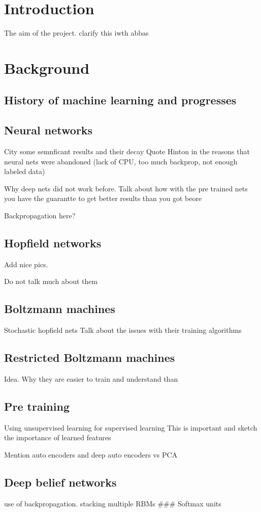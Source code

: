 \documentclass[]{article}
\author{}
\date{}
\begin{document}
\section{Introduction}

The aim of the project. clarify this iwth abbas

\section{Background}

\subsection{History of machine learning and progresses}

\subsection{Neural networks}

City some semnficant results and their decay Quote Hinton in the reasons
that neural nets were abandoned (lack of CPU, too much backprop, not
enough labeled data)

Why deep nets did not work before. Talk about how with the pre trained
nets you have the guarantte to get better results than you got beore

Backpropagation here?

\subsection{Hopfield networks}

Add nice pics.

Do not talk much about them

\subsection{Boltzmann machines}

Stochastic hopfield nets Talk about the issues with their training
algorithms

\subsection{Restricted Boltzmann machines}

Idea. Why they are easier to train and understand than

\subsection{Pre training}

Using unsupervised learning for supervised learning This is important
and sketch the importance of learned features

Mention auto encoders and deep auto encoders vs PCA

\subsection{Deep belief networks}

use of backpropagation. stacking multiple RBMs \#\#\# Softmax units
\end{document}
